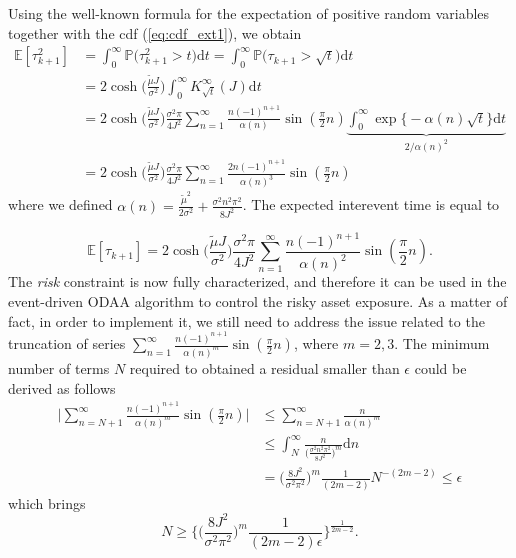 Using the well-known formula for the expectation of positive random variables together with the cdf (\ref{eq:cdf_ext1}), we obtain
\begin{align*}
\mathbb{E}[\tau_{k+1}^2] & = \int_{0}^{\infty}\mathbb{P}\big(\tau_{k+1}^2>t\big)\mathrm{d}t = \int_{0}^{\infty}\mathbb{P}\big(\tau_{k+1}>\sqrt{t}\big)\mathrm{d}t\\[1.5ex]
& = 2\cosh\Big(\frac{\widetilde{\mu}J}{\sigma^2}\Big)\int_{0}^{\infty}K_{\sqrt{t}}^{\infty}(J)\mathrm{d}t \\[1.5ex]
& = 2\cosh\Big(\frac{\widetilde{\mu}J}{\sigma^2}\Big)\frac{\sigma^2\pi}{4J^2}\sum_{n=1}^{\infty}\frac{n(-1)^{n+1}}{\alpha(n)}\sin(\frac{\pi}{2}n)
\underbrace{\int_{0}^{\infty}\exp\big\{-\alpha(n)\sqrt{t} \big\}\mathrm{d}t}_{2/\alpha(n)^2}\\
& = 2\cosh\Big(\frac{\widetilde{\mu}J}{\sigma^2}\Big)\frac{\sigma^2\pi}{4J^2}\sum_{n=1}^{\infty}\frac{2n(-1)^{n+1}}{\alpha(n)^3}\sin(\frac{\pi}{2}n)
\end{align*}
where we defined $\alpha(n) = \frac{\tilde{\mu}^2}{2\sigma^2} + \frac{\sigma^2n^2\pi^2}{8J^2}$. The expected interevent time is equal to

\begin{equation*}
\mathbb{E}[\tau_{k+1}] = 2\cosh\Big(\frac{\widetilde{\mu}J}{\sigma^2}\Big)\frac{\sigma^2\pi}{4J^2}\sum_{n=1}^{\infty}\frac{n(-1)^{n+1}}{\alpha(n)^2}\sin(\frac{\pi}{2}n).
\end{equation*}
The \textit{risk} constraint is now fully characterized, and therefore it can be used in the event-driven \gls{ODAA} algorithm to control the risky asset exposure. As a matter of fact, in order to implement it, we still need to address the issue related to the truncation of series $\sum_{n=1}^{\infty}\frac{n(-1)^{n+1}}{\alpha(n)^m}\sin(\frac{\pi}{2}n)$, where $m= 2,3$. The minimum number of terms $N$ required to obtained a residual smaller than $\epsilon$ could be derived as follows
\begin{align*}
\bigg\lvert \sum_{n=N+1}^{\infty}\frac{n(-1)^{n+1}}{\alpha(n)^m}\sin(\frac{\pi}{2}n)  \bigg\lvert   &\leq \sum_{n=N+1}^{\infty}\frac{n}{\alpha(n)^m}\\
& \leq \int_{N}^{\infty}\frac{n}{\big(\frac{\sigma^2n^2\pi^2}{8J^2}\big)^m}\mathrm{d}n\\
& = \Big(\frac{8J^2}{\sigma^2\pi^2}\Big)^m\frac{1}{(2m-2)}N^{-(2m-2)}\leq \epsilon
\end{align*}
which brings
\begin{equation}
N \geq \bigg\{\Big(\frac{8J^2}{\sigma^2\pi^2}\Big)^m\frac{1}{(2m-2)\epsilon}  \bigg\}^{\frac{1}{2m-2}}.
\end{equation}


